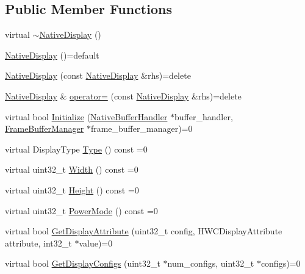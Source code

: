 \subsection*{Public Member Functions}
\begin{DoxyCompactItemize}
\item 
virtual \mbox{\hyperlink{classhwcomposer_1_1NativeDisplay_a7857bc77d2bcd1ff8352ab0b60698a57}{$\sim$\+Native\+Display}} ()
\item 
\mbox{\hyperlink{classhwcomposer_1_1NativeDisplay_ab1dc6bceb8fe62a576a99c75c7ae732b}{Native\+Display}} ()=default
\item 
\mbox{\hyperlink{classhwcomposer_1_1NativeDisplay_a6a0f2bcc4891497114cefa9fa8dd73f2}{Native\+Display}} (const \mbox{\hyperlink{classhwcomposer_1_1NativeDisplay}{Native\+Display}} \&rhs)=delete
\item 
\mbox{\hyperlink{classhwcomposer_1_1NativeDisplay}{Native\+Display}} \& \mbox{\hyperlink{classhwcomposer_1_1NativeDisplay_a548549436616b3b66b88fab4b4975f00}{operator=}} (const \mbox{\hyperlink{classhwcomposer_1_1NativeDisplay}{Native\+Display}} \&rhs)=delete
\item 
virtual bool \mbox{\hyperlink{classhwcomposer_1_1NativeDisplay_a008eb015dda9b4ead93186b4897c2e3c}{Initialize}} (\mbox{\hyperlink{classhwcomposer_1_1NativeBufferHandler}{Native\+Buffer\+Handler}} $\ast$buffer\+\_\+handler, \mbox{\hyperlink{classhwcomposer_1_1FrameBufferManager}{Frame\+Buffer\+Manager}} $\ast$frame\+\_\+buffer\+\_\+manager)=0
\item 
virtual Display\+Type \mbox{\hyperlink{classhwcomposer_1_1NativeDisplay_a67018275066174f9e5d4b801cd6fea31}{Type}} () const =0
\item 
virtual uint32\+\_\+t \mbox{\hyperlink{classhwcomposer_1_1NativeDisplay_a9a18c3dfba567c86c088b06febda4019}{Width}} () const =0
\item 
virtual uint32\+\_\+t \mbox{\hyperlink{classhwcomposer_1_1NativeDisplay_a09a19377e64e1fed90ae8315a8e71864}{Height}} () const =0
\item 
virtual uint32\+\_\+t \mbox{\hyperlink{classhwcomposer_1_1NativeDisplay_af03b22112e421559c5f59837a2209716}{Power\+Mode}} () const =0
\item 
virtual bool \mbox{\hyperlink{classhwcomposer_1_1NativeDisplay_aeb880e4a295eab49a98804380c2dcb84}{Get\+Display\+Attribute}} (uint32\+\_\+t config, H\+W\+C\+Display\+Attribute attribute, int32\+\_\+t $\ast$value)=0
\item 
virtual bool \mbox{\hyperlink{classhwcomposer_1_1NativeDisplay_a9479dcf82765996db6d7ea1cdcef3864}{Get\+Display\+Configs}} (uint32\+\_\+t $\ast$num\+\_\+configs, uint32\+\_\+t $\ast$configs)=0

\end{DoxyCompactItemize}

